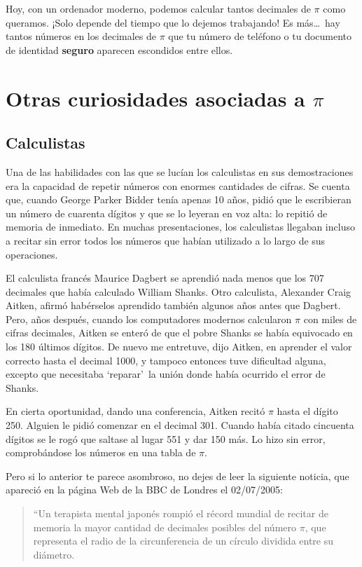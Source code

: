 {Hoy, con un ordenador moderno, podemos calcular tantos decimales de $\pi$ como queramos. ¡Solo depende del tiempo que lo dejemos trabajando!  
Es más\ldots\ hay tantos números en los decimales de $\pi$ que tu número de teléfono o tu documento de identidad \textbf{seguro} 
aparecen escondidos entre ellos.

\section*{Otras curiosidades asociadas a \texorpdfstring{$\pi$}{pi}}
\subsection*{Calculistas}
Una de las habilidades con las que se lucían los calculistas en sus demostraciones era la capacidad de repetir números 
con enormes cantidades de cifras. Se cuenta que, cuando George Parker Bidder tenía apenas 10 años, pidió que le escribieran 
un número de cuarenta dígitos y que se lo leyeran en voz alta: lo repitió de memoria de inmediato. 
En muchas presentaciones, los calculistas llegaban incluso a recitar sin error todos los números que habían utilizado 
a lo largo de sus operaciones.

El calculista francés Maurice Dagbert se aprendió nada menos que los 707 decimales que había calculado William Shanks. 
Otro calculista, Alexander Craig Aitken, afirmó habérselos aprendido también algunos años antes que Dagbert. Pero, 
años después, cuando los computadores modernos calcularon $\pi$ con miles de cifras decimales, Aitken se enteró de 
que el pobre Shanks se había equivocado en los 180 últimos dígitos. \guillemotleft De nuevo me entretuve\guillemotright, 
dijo Aitken, \guillemotleft en aprender el valor correcto hasta el decimal 1000, y tampoco entonces tuve dificultad alguna, 
excepto que necesitaba \textquoteleft reparar\textquoteright\ la unión donde había ocurrido el error de Shanks\guillemotright.

En cierta oportunidad, dando una conferencia, Aitken recitó $\pi$ hasta el dígito 250. Alguien le pidió comenzar en el decimal 301. 
Cuando había citado cincuenta dígitos se le rogó que saltase al lugar 551 y dar 150 más. Lo hizo sin error, comprobándose 
los números en una tabla de $\pi$.

Pero si lo anterior te parece asombroso, no dejes de leer la siguiente noticia, que apareció en la página Web de la BBC de Londres el 02/07/2005:

\begin{quote}
``Un terapista mental japonés rompió el récord mundial de recitar de memoria la mayor cantidad de decimales 
posibles del número $\pi$, que representa el radio de la circunferencia de un círculo dividida entre su diámetro.


\end{quote}}
